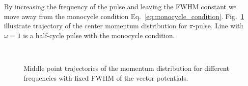 By increasing the frequency of the pulse and leaving the FWHM constant we move away from the monocycle condition Eq.~\eqref{eq:monocycle_condition}. Fig.~\ref{fig:Pulse_p_4} illustrate trajectory of the center momentum distribution for $\pi$-pulse. Line with $\omega=1$ is a half-cycle pulse with the monocycle condition.
\begin{figure}[h!]
 \\
\caption{Middle point trajectories of the momentum distribution for different frequencies with fixed FWHM of the vector potentials.}
\label{fig:Pulse_p_4}
\end{figure}

